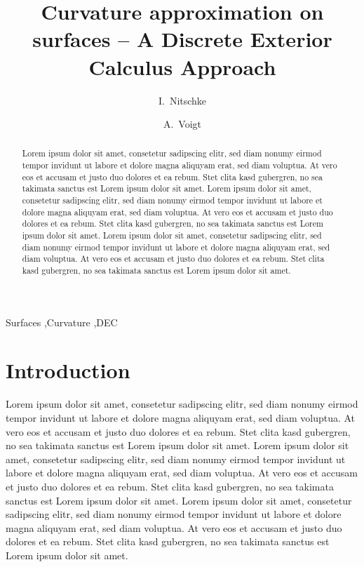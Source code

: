 


\begin{frontmatter}
  \title{Curvature approximation on surfaces -- A Discrete Exterior Calculus Approach}

  \author{I.~Nitschke}
  
  \author{A.~Voigt}


  \begin{abstract}
    Lorem ipsum dolor sit amet, consetetur sadipscing elitr, sed diam nonumy eirmod tempor invidunt ut labore et dolore magna aliquyam erat, sed diam voluptua. At vero eos et accusam et justo duo dolores et ea rebum. Stet clita kasd gubergren, no sea takimata sanctus est Lorem ipsum dolor sit amet. Lorem ipsum dolor sit amet, consetetur sadipscing elitr, sed diam nonumy eirmod tempor invidunt ut labore et dolore magna aliquyam erat, sed diam voluptua. At vero eos et accusam et justo duo dolores et ea rebum. Stet clita kasd gubergren, no sea takimata sanctus est Lorem ipsum dolor sit amet. Lorem ipsum dolor sit amet, consetetur sadipscing elitr, sed diam nonumy eirmod tempor invidunt ut labore et dolore magna aliquyam erat, sed diam voluptua. At vero eos et accusam et justo duo dolores et ea rebum. Stet clita kasd gubergren, no sea takimata sanctus est Lorem ipsum dolor sit amet.
  \end{abstract}

  \begin{keyword}
    Surfaces \sep Curvature \sep DEC
  \end{keyword}
\end{frontmatter}

\section{Introduction}
Lorem ipsum dolor sit amet, consetetur sadipscing elitr, sed diam nonumy eirmod tempor invidunt ut labore et dolore magna aliquyam erat, sed diam voluptua. At vero eos et accusam et justo duo dolores et ea rebum. Stet clita kasd gubergren, no sea takimata sanctus est Lorem ipsum dolor sit amet. Lorem ipsum dolor sit amet, consetetur sadipscing elitr, sed diam nonumy eirmod tempor invidunt ut labore et dolore magna aliquyam erat, sed diam voluptua. At vero eos et accusam et justo duo dolores et ea rebum. Stet clita kasd gubergren, no sea takimata sanctus est Lorem ipsum dolor sit amet. Lorem ipsum dolor sit amet, consetetur sadipscing elitr, sed diam nonumy eirmod tempor invidunt ut labore et dolore magna aliquyam erat, sed diam voluptua. At vero eos et accusam et justo duo dolores et ea rebum. Stet clita kasd gubergren, no sea takimata sanctus est Lorem ipsum dolor sit amet.

